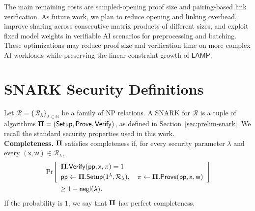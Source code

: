 \documentclass[conference,compsoc]{IEEEtran}
\newcommand{\para}{\textsf{pp}}
\newcommand{\bPi}{{\bf \Pi}}
\newcommand{\setup}{{\sf Setup}}
\newcommand{\prove}{{\sf Prove}}
\renewcommand{\verify}{{\sf Verify}}
\newcommand{\relation}{{\mathcal{R}}}
\newcommand{\stmt}{\mathsf{x}}      %
\newcommand{\wit}{\mathsf{w}}       %
\newcommand{\protocol}{\textsf{LAMP}}   %
\theoremstyle{plain}
\theoremstyle{definition}
\theoremstyle{remark}
\providecommand{\DIFaddbegin}{} %
\providecommand{\DIFaddend}{} %
\providecommand{\DIFaddincludegraphics}[2][]{{\color{blue}\fbox{\DIFOincludegraphics[#1]{#2}}}} %
\DeclareRobustCommand{\DIFaddbegin}{\DIFOaddbegin \let\includegraphics\DIFaddincludegraphics} %
\DeclareRobustCommand{\DIFaddend}{\DIFOaddend \let\includegraphics\DIFOincludegraphics} %
\begin{document}
The main remaining costs are sampled-opening proof size and pairing-based link
verification.  As future work, we plan to reduce opening and linking overhead,
improve sharing across consecutive matrix products of different sizes, and
exploit fixed model weights in verifiable AI scenarios for preprocessing and
batching.  These optimizations may reduce proof size and verification time on
more complex AI workloads while preserving the linear constraint growth of
\(\protocol\).


\newpage





\appendices
\DIFaddbegin \iffalse
\DIFaddend \section{SNARK Security Definitions}
\label{app:snark-security}

Let \(\relation=\{\relation_\lambda\}_{\lambda\in\mathbb{N}}\) be a family of
NP relations.  A SNARK for \(\relation\) is a tuple of algorithms
\(\bPi=(\setup,\prove,\verify)\), as defined in
Section~\ref{sec:prelim-snark}.  We recall the standard security properties
used in this work. \\

\noindent\textbf{Completeness.}
\(\bPi\) satisfies completeness if, for every security parameter \(\lambda\)
and every \((\stmt,\wit)\in\relation_\lambda\),
\[
\begin{aligned}
&\Pr\!\left[
\begin{array}{l}
  \bPi.\verify(\para,\stmt,\pi)=1
  \\[1mm]
  \para\gets\bPi.\setup(1^\lambda,\relation_\lambda),
  \quad
  \pi\gets\bPi.\prove(\para,\stmt,\wit)
\end{array}
\right]
\\
&\hspace{2em}\ge 1-\textsf{negl}(\lambda).
\end{aligned}
\]
If the probability is \(1\), we say that \(\bPi\) has perfect completeness. \\
\end{document}
